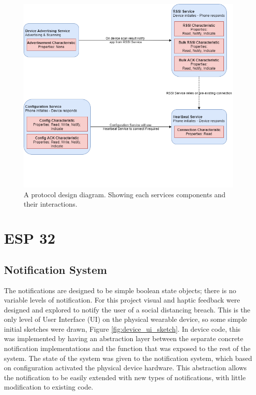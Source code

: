 \documentclass{l4proj}
\begin{document}
\begin{figure}[!htb]
    \centering
    \includegraphics[width=0.8\linewidth]{images/protocol_design.png}

    \caption{ A protocol design diagram. Showing each services components and their interactions. }

    \label{fig:protocol_diagram}
\end{figure}

\section{ESP 32}

\subsection{Notification System}

The notifications are designed to be simple boolean state objects; there is no variable levels of notification. For this project visual and haptic feedback were designed and explored to notify the user of a social distancing breach. This is the only level of User Interface (UI) on the physical wearable device, so some simple initial sketches were drawn, Figure \ref{fig:device_ui_sketch}. In device code, this was implemented by having an abstraction layer between the separate concrete notification implementations and the function that was exposed to the rest of the system. The state of the system was given to the notification system, which based on configuration activated the physical device hardware. This abstraction allows the notification to be easily extended with new types of notifications, with little modification to existing code.
\end{document}
